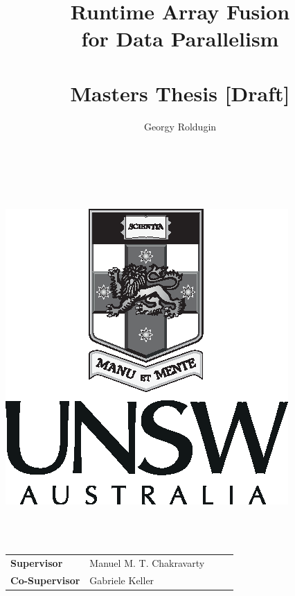 \documentclass[preamble.tex]{subfiles}
\begin{document}
\pagebreak{}


\title{Runtime Array Fusion\\
for Data Parallelism\\
\ \\
Masters Thesis [Draft]}


\author{Georgy Roldugin}

\maketitle
~\\
\\


\begin{center}
\includegraphics{img/UNSW-PortraitGreyscale-Black}
\par\end{center}

~\\
\\


\begin{center}

\par\end{center}

\begin{center}
\begin{tabular}{ll}
\textbf{Supervisor} & Manuel M. T. Chakravarty~~~~~\tabularnewline
\textbf{Co-Supervisor} & Gabriele Keller\tabularnewline
\end{tabular}
\par\end{center}
\end{document}
